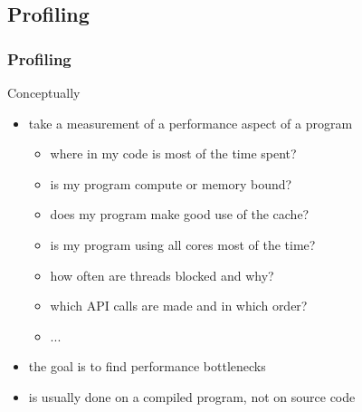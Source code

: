 \subsection[prof]{Profiling}

\begin{frame}[fragile]
  \frametitle{Profiling}
  \begin{block}{Conceptually}
    \begin{itemize}
      \item take a measurement of a performance aspect of a program
      \begin{itemize}
        \item where in my code is most of the time spent?
        \item is my program compute or memory bound?
        \item does my program make good use of the cache?
        \item is my program using all cores most of the time?
        \item how often are threads blocked and why?
        \item which API calls are made and in which order?
        \item ...
      \end{itemize}
      \item the goal is to find performance bottlenecks
      \item is usually done on a compiled program, not on source code
    \end{itemize}
  \end{block}
\end{frame}

